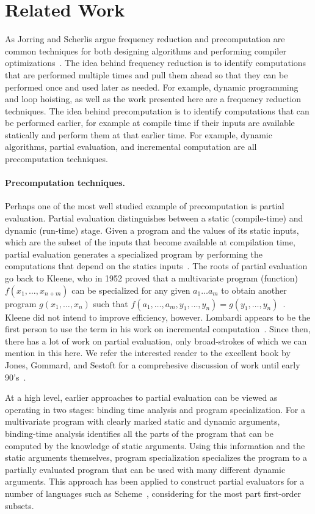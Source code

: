 \section{Related Work}
\label{sec:related}

As Jorring and Scherlis argue frequency reduction and precomputation
are common techniques for both designing algorithms and performing
compiler optimizations~\cite{JS86-staging}.  The idea behind frequency
reduction is to identify computations that are performed multiple
times and pull them ahead so that they can be performed once and used
later as needed.  For example, dynamic programming and loop hoisting,
as well as the work presented here are a frequency reduction
techniques.
%
The idea behind precomputation is to identify computations that can be
performed earlier, for example at compile time if their inputs are
available statically and perform them at that earlier time.  For
example, dynamic algorithms, partial evaluation, and incremental
computation are all precomputation techniques.

\paragraph{Precomputation techniques.}
Perhaps one of the most well studied example of precomputation is
partial evaluation.  Partial evaluation distinguishes between a static
(compile-time) and dynamic (run-time) stage. Given a program and the
values of its static inputs, which are the subset of the inputs that
become available at compilation time, partial evaluation generates a
specialized program by performing the computations that depend on the
statics inputs~\cite{jones96}.  The roots of partial evaluation go
back to Kleene, who in 1952 proved that a multivariate program
(function) $f(x_1, \ldots, x_{n+m})$ can be specialized for any given
$a_1 \ldots a_m$ to obtain another program $g(x_1, \ldots, x_n)$ such
that $f(a_1, \ldots, a_m, y_1, \ldots, y_n) = g(y_1, \ldots,
y_n)$~\cite{Kleene52}.  Kleene did not intend to improve efficiency,
however.  Lombardi appears to be the first person to use the term in
his work on incremental computation~\cite{Lombardi67}.  Since then,
there has a lot of work on partial evaluation, only broad-strokes of
which we can mention in this here.  We refer the interested reader to
the excellent book by Jones, Gommard, and Sestoft for a comprehesive
discussion of work until early 90's~\cite{JGS93}.

At a high level, earlier approaches to partial evaluation can be
viewed as operating in two stages: binding time analysis and program
specialization.  For a multivariate program with clearly marked static
and dynamic arguments, binding-time analysis identifies all the parts
of the program that can be computed by the knowledge of static
arguments. Using this information and the static arguments themselves,
program specialization specializes the program to a partially
evaluated program that can be used with many different dynamic
arguments.  This approach has been applied to construct partial
evaluators for a number of languages such as
Scheme~\cite{OB91-Similix,Consel88-Schism}, considering for the most
part first-order subsets.

